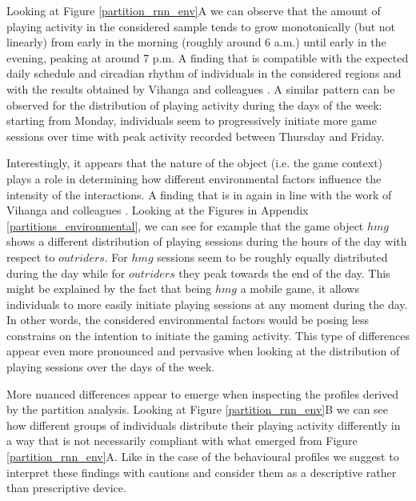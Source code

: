 Looking at Figure \ref{partition_rnn_env}A we can observe that the amount of playing activity in the considered sample tends to grow monotonically (but not linearly) from early in the morning (roughly around 6 a.m.) until early in the evening, peaking at around 7 p.m. A finding that is compatible with the expected daily schedule and circadian rhythm of individuals in the considered regions \cite{vitaterna2001overview} and with the results obtained by Vihanga and colleagues \cite{vihanga2019weekly}. A similar pattern can be observed for the distribution of playing activity during the days of the week: starting from Monday, individuals seem to progressively initiate more game sessions over time with peak activity recorded between Thursday and Friday. 

Interestingly, it appears that the nature of the object (i.e. the game context) plays a role in determining how different environmental factors influence the intensity of the interactions. A finding that is in again in line with the work of Vihanga and colleagues \cite{vihanga2019weekly, wannigamage2021player}. Looking at the Figures in Appendix \ref{partitions_environmental}, we can see for example that the game object $hmg$ shows a different distribution of playing sessions during the hours of the day with respect to $outriders$. For $hmg$ sessions seem to be roughly equally distributed during the day while for $outriders$ they peak towards the end of the day. This might be explained by the fact that being $hmg$ a mobile game, it allows individuals to  more easily initiate playing sessions at any moment during the day. In other words, the considered environmental factors would be posing less constrains on the intention to initiate the gaming activity. This type of differences appear even more pronounced and pervasive when looking at the distribution of playing sessions over the days of the week. 

More nuanced differences appear to emerge when inspecting the profiles derived by the partition analysis. Looking at Figure \ref{partition_rnn_env}B we can see how different groups of individuals distribute their playing activity differently in a way that is not necessarily compliant with what emerged from Figure \ref{partition_rnn_env}A. Like in the case of the behavioural profiles we suggest to interpret these findings with cautions and consider them as a descriptive rather than prescriptive device. 

